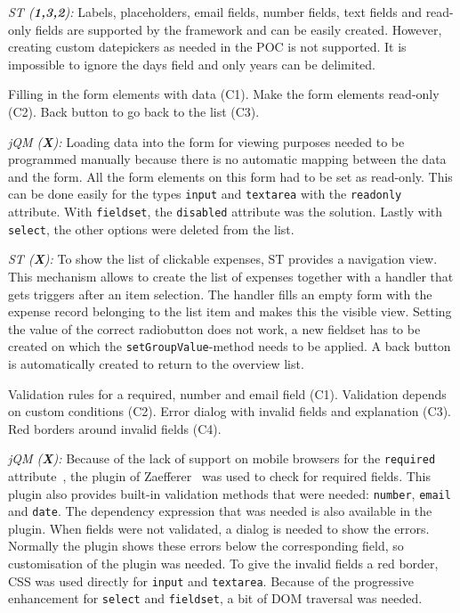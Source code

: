 \documentclass[a4paper]{artikel3}
\newcommand{\code}[1]{\texttt{#1}}
\renewcommand{\paragraph}[1]{\vspace{2mm} \noindent {\bf #1}  }
\newcommand{\framework}[2]{ \emph{#1 (\textbf{#2}): }} %
\newcommand{\challenge}[1]{\paragraph{#1}}
\begin{document}
\framework{ST}{1,3,2}
Labels,  placeholders,  email fields, number fields, text fields and read-only fields are supported by the framework and can be easily created.  However, creating custom datepickers as needed in the POC is not supported.  It is impossible to ignore the days field and only years can be delimited.  

\challenge{Form filling (C1,C2,C3)}
Filling in the form elements with data (C1).
Make the form elements read-only (C2).
Back button to go back to the list (C3).

\framework{jQM}{X}
Loading data into the form for viewing purposes needed to be programmed manually because there is no automatic mapping between the data and the form.
All the form elements on this form had to be set as read-only.
This can be done easily for the types \code{input} and \code{textarea} with the \code{readonly} attribute.
With \code{fieldset}, the \code{disabled} attribute was the solution.
Lastly with \code{select}, the other options were deleted from the list.

\framework{ST}{X}
To show the list of clickable expenses,  ST provides a navigation view.  This mechanism allows to create the list of expenses together with a handler that gets triggers after an item selection.  The handler fills an empty form with the expense record belonging to the list item and makes this the visible view.  Setting the value of the correct radiobutton does not work,  a new fieldset has to be created on which the \code{setGroupValue}-method needs to be applied.  A back button is automatically created to return to the overview list.

\challenge{Form validation (C1,C2,C3,C4)}
Validation rules for a required, number and email field (C1).
Validation depends on custom conditions (C2).
Error dialog with invalid fields and explanation (C3).
Red borders around invalid fields (C4).

\framework{jQM}{X}
Because of the lack of support on mobile browsers for the \code{required} attribute~\cite{Deveria2013}, the plugin of Zaefferer~\cite{Zaefferer2013} was used to check for required fields.
This plugin also provides built-in validation methods that were needed: \code{number}, \code{email} and \code{date}.
The dependency expression that was needed is also available in the plugin.
When fields were not validated, a dialog is needed to show the errors.
Normally the plugin shows these errors below the corresponding field, so customisation of the plugin was needed.
To give the invalid fields a red border, CSS was used directly for \code{input} and \code{textarea}.
Because of the progressive enhancement for \code{select} and \code{fieldset}, a bit of DOM traversal was needed.
\end{document}

